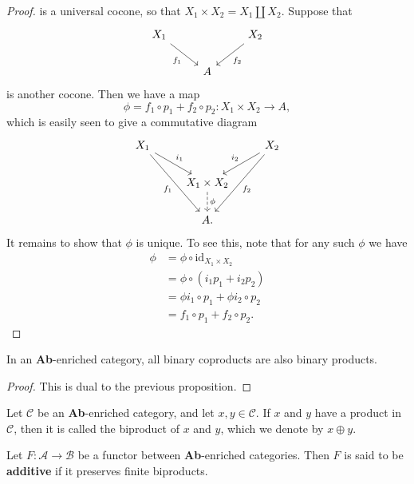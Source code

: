 \begin{proof}
is a universal cocone, so that $ X_1 \times X_2 = X_1 \coprod X_2 $. Suppose that
\[\begin{tikzcd}
	{X_1} && {X_2} \\
	& A
	\arrow["{f_1}"', from=1-1, to=2-2]
	\arrow["{f_2}", from=1-3, to=2-2]
\end{tikzcd}\]
is another cocone. Then we have a map
\begin{equation*}
\phi = f_1 \circ p_1 + f_2\circ p_2: X_1 \times X_2 \to A,
\end{equation*}
which is easily seen to give a commutative diagram
\[\begin{tikzcd}
	{X_1} && {X_2} \\
	& {X_1 \times X_2} \\
	& A.
	\arrow["{i_1}", from=1-1, to=2-2]
	\arrow["{i_2}"', from=1-3, to=2-2]
	\arrow["\phi", dashed, from=2-2, to=3-2]
	\arrow["{f_1}"', from=1-1, to=3-2]
	\arrow["{f_2}", from=1-3, to=3-2]
\end{tikzcd}\]
It remains to show that $ \phi $ is unique. To see this, note that for any such $ \phi $ we have
\begin{align*}
  \phi &= \phi\circ \text{id}_{X_1 \times X_2} \\
       &= \phi \circ (i_1p_1 + i_2 p_2) \\
       &= \phi i_1 \circ p_1 + \phi i_2\circ p_2 \\
       &= f_1\circ p_1 + f_2 \circ p_2
.\end{align*}
\end{proof}

\begin{proposition}
   In an \textbf{Ab}-enriched category, all binary coproducts are also binary products.
\end{proposition}
\begin{proof}
  This is dual to the previous proposition.
\end{proof}

\begin{definition}
  Let $ \mathcal{C} $ be an \textbf{Ab}-enriched category, and let $ x,y \in \mathcal{C} $. If $ x $ and $ y $ have a product in $ \mathcal{C} $, then it is called the biproduct of $ x $ and $ y $, which we denote by $ x \oplus y $.
\end{definition}

\begin{definition}
  Let $ F: \mathcal{A} \to \mathcal{B} $ be a functor between \textbf{Ab}-enriched categories. Then $ F $ is said to be \textbf{additive} if it preserves finite biproducts.
\end{definition}

